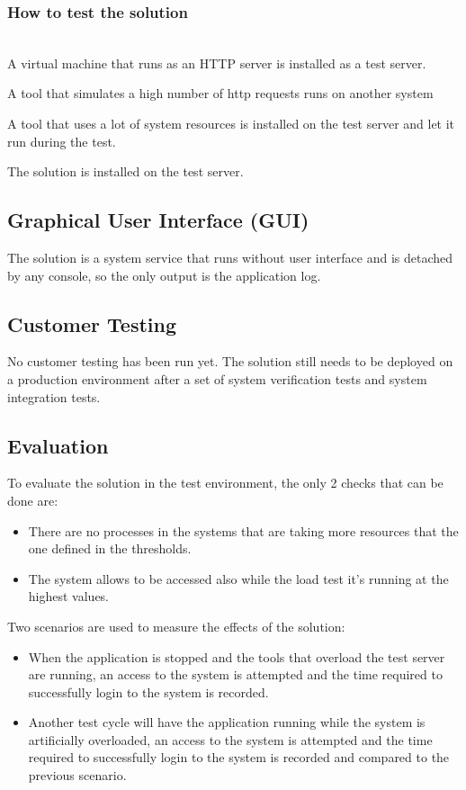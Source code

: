 \documentclass[conference]{IEEEtran}
\begin{document}
\subsubsection{How to test the solution} ~\\
A virtual machine that runs as an HTTP server is installed as a test server. 

A tool that simulates a high number of http requests runs on another system

A tool that uses a lot of system resources is installed on the test server and let it run during the test.

The solution is installed on the test server.

\subsection{Graphical User Interface (GUI)}
The solution is a system service that runs without user interface and is detached by any console, so the only output is the application log.

\subsection{Customer Testing}
No customer testing has been run yet. The solution still needs to be deployed on a production environment after a set of system verification tests and system integration tests.

\subsection{Evaluation}
To evaluate the solution in the test environment, the only 2 checks that can be done are:
\begin{itemize}
\item There are no processes in the systems that are taking more resources that the one defined in the thresholds.
\item The system allows to be accessed also while the load test it’s running at the highest values.
\end{itemize}

Two scenarios are used to measure the effects of the solution: 
\begin{itemize}
\item When the application is stopped and the tools that overload the test server are running, an access to the system is attempted and the time required to successfully login to the system is recorded.
\item Another test cycle will have the application running while the system is artificially overloaded, an access to the system is attempted and the time required to successfully login to the system is recorded and compared to the previous scenario.
\end{itemize}
\end{document}
